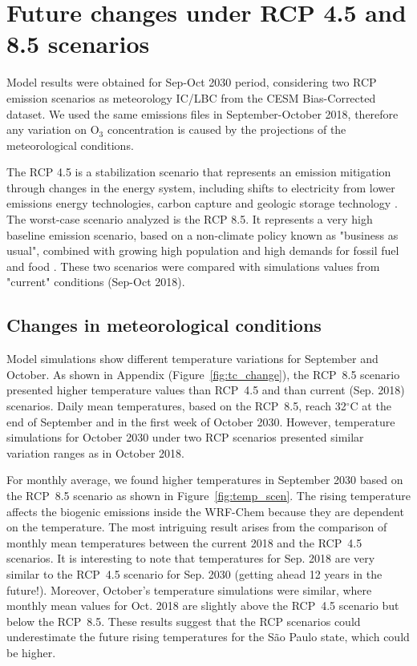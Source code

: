 

\section{Future changes under RCP 4.5 and 8.5 scenarios} \label{sec:res_fut}
Model results were obtained for Sep-Oct 2030 period, considering two RCP emission scenarios as meteorology IC/LBC from the CESM Bias-Corrected dataset. We used the same emissions files in September-October 2018, therefore any variation on O$_3$ concentration is caused by the projections of the meteorological conditions.

The RCP 4.5 is a stabilization scenario that represents an emission mitigation through changes in the energy system, including shifts to electricity from lower emissions energy technologies, carbon capture and geologic storage technology \citep{Thomson2011}.
The worst-case scenario analyzed is the RCP 8.5.
It represents a very high baseline emission scenario, based on a non-climate policy known as "business as usual", combined with growing high population and high demands for fossil fuel and food \citep{Riahi2011}.
These two scenarios were compared with simulations values from "current" conditions (Sep-Oct 2018).

\subsection{Changes in meteorological conditions}\label{subsec:res_chan_met}
Model simulations show different temperature variations for September and October.
As shown in Appendix (Figure~\ref{fig:tc_change}), the RCP~8.5 scenario presented higher temperature values than RCP~4.5 and than current (Sep. 2018) scenarios.
Daily mean temperatures, based on the RCP~8.5, reach 32$^\circ$C at the end of September and in the first week of October 2030.
However, temperature simulations for October 2030 under two RCP scenarios presented similar variation ranges as in October 2018.

For monthly average, we found higher temperatures in September 2030 based on the RCP~8.5 scenario as shown in Figure~\ref{fig:temp_scen}.
The rising temperature affects the biogenic emissions inside the WRF-Chem because they are dependent on the temperature.
The most intriguing result arises from the comparison of monthly mean temperatures between the current 2018 and the RCP~4.5 scenarios.
It is interesting to note that temperatures for Sep. 2018 are very similar to the RCP~4.5 scenario for Sep. 2030 (getting ahead 12 years in the future!).
Moreover, October's temperature simulations were similar, where monthly mean values for Oct. 2018 are slightly above the RCP~4.5 scenario but below the RCP~8.5.
These results suggest that the RCP scenarios could underestimate the future rising temperatures for the S\~{a}o Paulo state, which could be higher.

